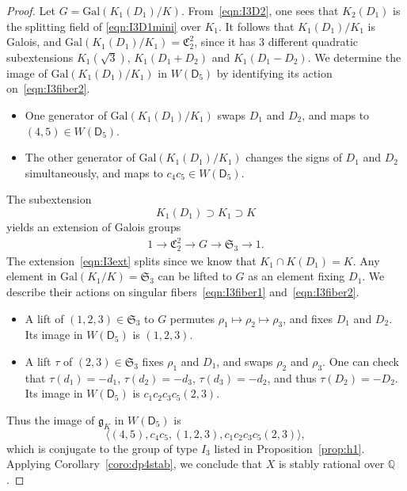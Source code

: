 \documentclass[10pt,a4paper]{amsart}
\def\Gal{\mathrm{Gal}}
\def\bQ{{\mathbb Q}}
\def\fC{{\mathfrak C}}
\def\fS{{\mathfrak S}}
\def\sD{{\mathsf D}}
\begin{document}
\begin{proof}
 Let $G=\Gal(K_1(D_1)/K)$. From~\eqref{eqn:I3D2}, one sees that $K_2(D_1)$ is the splitting field of \eqref{eqn:I3D1mini} over $K_1$. It follows that $K_1(D_1)/K_1$ is Galois, and $\Gal(K_1(D_1)/K_1)=\fC_2^2$, since it has 3 different quadratic subextensions $K_1(\sqrt3)$, $K_1(D_1+D_2)$ and $K_1(D_1-D_2)$. We determine the image of $\Gal(K_1(D_1)/K_1)$ in $W(\sD_5)$ by identifying its action on~\eqref{eqn:I3fiber2}.
\begin{itemize}
    \item One generator of $\Gal(K_1(D_1)/K_1)$ swaps $D_1$ and $D_2$, and maps to $(4,5)\in W(\sD_5)$.
    \item The other generator of $\Gal(K_1(D_1)/K_1)$ changes the signs of $D_1$ and $D_2$ simultaneously, and maps to $c_4c_5\in W(\sD_5).$
\end{itemize}
The subextension 
$$
K_1(D_1)\supset K_1\supset K
$$
yields an extension of Galois groups
\begin{align}
    \label{eqn:I3ext}
    1\to \fC_2^2\to G\to\fS_3\to 1.
\end{align}
The extension~\eqref{eqn:I3ext} splits since we know that 
$
  K_1\cap K(D_1)=K.  
$
Any element in $\Gal(K_1/K)=\fS_3$ can be lifted to $G$ as an element fixing $D_1$. We describe their actions on singular fibers~\eqref{eqn:I3fiber1} and~\eqref{eqn:I3fiber2}.
\begin{itemize}
    \item A lift of $(1,2,3)\in\fS_3$ to $G$ permutes $\rho_1\mapsto\rho_2\mapsto\rho_3$, and fixes $D_1$ and $D_2$. Its image in $W(\sD_5)$ is $(1,2,3)$.
    \item A lift $\tau$ of $(2,3)\in\fS_3$ fixes $\rho_1$ and $D_1$, and swaps $\rho_2$ and $\rho_3$. One can check that $\tau (d_1)=-d_1$, $\tau(d_2)=-d_3$, $\tau(d_3)=-d_2$, and thus $\tau(D_2)=-D_2$. Its image in $W(\sD_5)$ is $c_1c_2c_3c_5(2,3)$.
\end{itemize}
Thus the image of $\mathfrak g_K$ in $W(\sD_5)$ is 
$$
\langle (4,5),c_4c_5,(1,2,3),c_1c_2c_3c_5(2,3)\rangle,
$$
which is conjugate to the group of type $I_3$ listed in Proposition~\ref{prop:h1}. Applying Corollary~\ref{coro:dp4stab}, we conclude that $X$ is stably rational over $\bQ$. 
\end{proof} 
\end{document}
